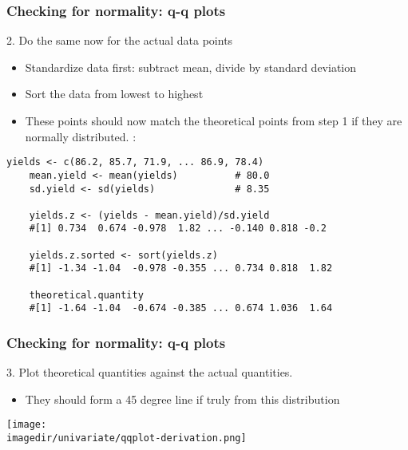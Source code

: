 \begin{frame}[fragile]\frametitle{Checking for normality: q-q plots}
	2. Do the same now for the actual data points
	\begin{itemize}
		\item	Standardize data first: subtract mean, divide by standard deviation
		\item	Sort the data from lowest to highest
		\item	These points should now match the theoretical points from step 1 if they are normally distributed. \emph{{\color{myGreen}{Example}}}:
	\end{itemize}
	
	\begin{lstlisting}[R]
	yields <- c(86.2, 85.7, 71.9, ... 86.9, 78.4)
	mean.yield <- mean(yields)          # 80.0
	sd.yield <- sd(yields)              # 8.35

	yields.z <- (yields - mean.yield)/sd.yield
	#[1] 0.734  0.674 -0.978  1.82 ... -0.140 0.818 -0.2

	yields.z.sorted <- sort(yields.z)
	#[1] -1.34 -1.04  -0.978 -0.355 ... 0.734 0.818  1.82

	theoretical.quantity  
	#[1] -1.64 -1.04  -0.674 -0.385 ... 0.674 1.036  1.64
	\end{lstlisting}
\end{frame}

\begin{frame}\frametitle{Checking for normality: q-q plots}

	3. Plot theoretical quantities against the actual quantities.
	\begin{itemize}
		\item	\small They should form a 45 degree line if truly from this distribution
	\end{itemize}
	\begin{center}
		\texttt{[image: \\imagedir/univariate/qqplot-derivation.png]}
	\end{center}
\end{frame}

